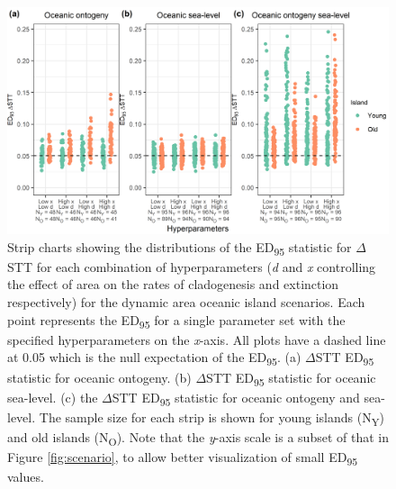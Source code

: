 \documentclass{article}
\begin{document}
\begin{figure}
    \centering
    \includegraphics[width=\textwidth]{oceanic_hyperparameters_spec_nltt.png}
    \caption{Strip charts showing the distributions of the ED\textsubscript{95} statistic for $\Delta$STT for each combination of hyperparameters (\textit{d} and \textit{x} controlling the effect of area on the rates of cladogenesis and extinction respectively) for the dynamic area oceanic island scenarios. Each point represents the ED\textsubscript{95} for a single parameter set with the specified hyperparameters on the \textit{x}-axis. All plots have a dashed line at 0.05 which is the null expectation of the ED\textsubscript{95}. (a) $\Delta$STT ED\textsubscript{95} statistic for oceanic ontogeny. (b) $\Delta$STT ED\textsubscript{95} statistic for oceanic sea-level. (c) the $\Delta$STT ED\textsubscript{95} statistic for oceanic ontogeny and sea-level. The sample size for each strip is shown for young islands (N\textsubscript{Y}) and old islands (N\textsubscript{O}). Note that the \textit{y}-axis scale is a subset of that in Figure \ref{fig:scenario}, to allow better visualization of small ED\textsubscript{95} values.}
    \label{fig:oceanic_hyperparameters_spec_nltt}
\end{figure}

\clearpage
\end{document}
